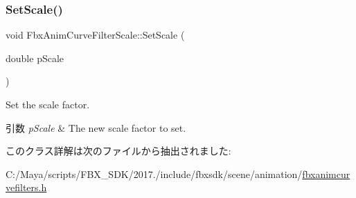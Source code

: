 \subsubsection{\texorpdfstring{Set\+Scale()}{SetScale()}}
{\footnotesize\ttfamily void Fbx\+Anim\+Curve\+Filter\+Scale\+::\+Set\+Scale (\begin{DoxyParamCaption}\item[{double}]{p\+Scale }\end{DoxyParamCaption})}

Set the scale factor. 
\begin{DoxyParams}{引数}
{\em p\+Scale} & The new scale factor to set. \\
\hline
\end{DoxyParams}


このクラス詳解は次のファイルから抽出されました\+:\begin{DoxyCompactItemize}
\item 
C\+:/\+Maya/scripts/\+F\+B\+X\+\_\+\+S\+D\+K/2017./include/fbxsdk/scene/animation/\hyperlink{fbxanimcurvefilters_8h}{fbxanimcurvefilters.\+h}\end{DoxyCompactItemize}
